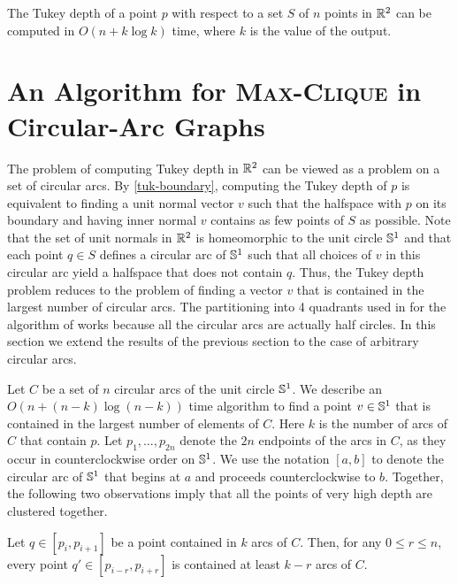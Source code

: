 \documentclass[charterfonts,lotsofwhite]{patmorin}
\begin{document}
\begin{thm}
The Tukey depth of a point $p$ with respect to a set $S$ of $n$ points
in $\mathbb{R}^2$ can be computed in $O(n + k\log k)$ time, where
$k$ is the value of the output.
\end{thm}

\section{An Algorithm for \textsc{Max-Clique} in Circular-Arc Graphs}

The problem of computing Tukey depth in $\mathbb{R}^2$ can be viewed as a
problem on a set of circular arcs.  By \eqref{tuk-boundary}, computing
the Tukey depth of $p$ is equivalent to finding a unit normal vector
$v$ such that the halfspace with $p$ on its boundary and having inner
normal $v$ contains as few points of $S$ as possible.  Note that the
set of unit normals in $\mathbb{R}^2$ is homeomorphic to the unit circle
$\mathbb{S}^1$ and that each point $q\in S$ defines a circular arc of $\mathbb{S}^1$
such that all choices of $v$ in this circular arc yield a halfspace
that does not contain $q$.  Thus, the Tukey depth problem reduces to
the problem of finding a vector $v$ that is contained in the largest
number of circular arcs. The partitioning into 4 quadrants used in for
the algorithm of  works because all the circular arcs are
actually half circles.  In this section we extend the results of the
previous section to the case of arbitrary circular arcs.

Let $C$ be a set of $n$ circular arcs of the unit circle $\mathbb{S}^1$.  We
describe an $O(n+(n-k)\log (n-k))$ time algorithm to find a point
$v\in\mathbb{S}^1$ that is contained in the largest number of elements of
$C$.  Here $k$ is the number of arcs of $C$ that contain $p$.  Let
$p_1,\ldots,p_{2n}$ denote the $2n$ endpoints of the arcs in $C$, as
they occur in counterclockwise order on $\mathbb{S}^1$.  We use the notation
$[a,b]$ to denote the circular arc of $\mathbb{S}^1$ that begins at $a$ and
proceeds counterclockwise to $b$.  Together, the following two
observations imply that all the points of very high depth are
clustered together.

\begin{obs}
Let $q\in[p_i,p_{i+1}]$ be a point contained in $k$ arcs of $C$.
Then, for any $0\le r\le n$, every point $q'\in[p_{i-r},p_{i+r}]$ is
contained at least $k-r$ arcs of $C$.
\end{obs}
\end{document}
